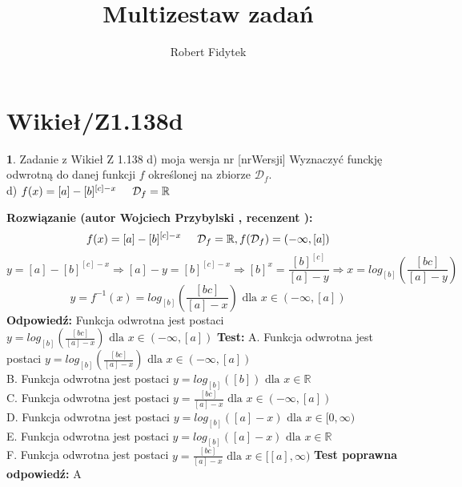 \documentclass[12pt, a4paper]{article}
\title{Multizestaw zadań}
\author{Robert Fidytek}
\date{}
\theoremstyle{definition} %
\newtheorem{zad}{}
\newcommand{\kategoria}[1]{\section{#1}} %
\newcommand{\zadStart}[1]{\begin{zad}#1\newline} %
\newcommand{\zadStop}{\end{zad}}   %
\newcommand{\rozwStart}[2]{\noindent \textbf{Rozwiązanie (autor #1 , recenzent #2): }\newline} %
\newcommand{\rozwStop}{\newline}                                            %
\newcommand{\odpStart}{\noindent \textbf{Odpowiedź:}\newline}    %
\newcommand{\odpStop}{\newline}                                             %
\newcommand{\testStart}{\noindent \textbf{Test:}\newline} %
\newcommand{\testStop}{\newline} %
\newcommand{\kluczStart}{\noindent \textbf{Test poprawna odpowiedź:}\newline} %
\newcommand{\kluczStop}{\newline} %
\begin{document}
\maketitle


\kategoria{Wikieł/Z1.138d}
\zadStart{Zadanie z Wikieł Z 1.138 d) moja wersja nr [nrWersji]}
Wyznaczyć funckję odwrotną do danej funkcji $f$ określonej na zbiorze $\mathcal{D}_{f}$.\\
d) $f(x)=[a]-[b]^{[c]-x}\hspace{5mm}\mathcal{D}_{f}=\mathbb{R}$
\zadStop
\rozwStart{Wojciech Przybylski}{}
$$f(x)=[a]-[b]^{[c]-x}\hspace{5mm} \mathcal{D}_{f}=\mathbb{R}, f(\mathcal{D}_{f})=(-\infty,[a])$$
$$y=[a]-[b]^{[c]-x}\Rightarrow [a]-y=[b]^{[c]-x} \Rightarrow [b]^{x}=\frac{[b]^{[c]}}{[a]-y} \Rightarrow x=log_{[b]}(\frac{[bc]}{[a]-y})$$
$$y=f^{-1}(x)=log_{[b]}(\frac{[bc]}{[a]-x}) \mbox{ dla } x\in (-\infty,[a])$$
\rozwStop
\odpStart
Funkcja odwrotna jest postaci $y=log_{[b]}(\frac{[bc]}{[a]-x}) \mbox{ dla }x\in (-\infty,[a])$
\odpStop
\testStart
A. Funkcja odwrotna jest postaci $y=log_{[b]}(\frac{[bc]}{[a]-x})  \mbox{ dla }x\in(-\infty,[a])$\\
B. Funkcja odwrotna jest postaci $y=log_{[b]}([b]) \mbox{ dla }x\in\mathbb{R}$\\
C. Funkcja odwrotna jest postaci $y=\frac{[bc]}{[a]-x}  \mbox{ dla }x\in(-\infty,[a])$\\
D. Funkcja odwrotna jest postaci $y=log_{[b]}([a]-x)  \mbox{ dla }x\in[0,\infty)$\\
E. Funkcja odwrotna jest postaci $y=log_{[b]}([a]-x) \mbox{ dla }x\in \mathbb{R}$\\
F. Funkcja odwrotna jest postaci $y=\frac{[bc]}{[a]-x}\mbox{ dla }x\in[[a],\infty)$
\testStop
\kluczStart
A
\kluczStop
\end{document}
